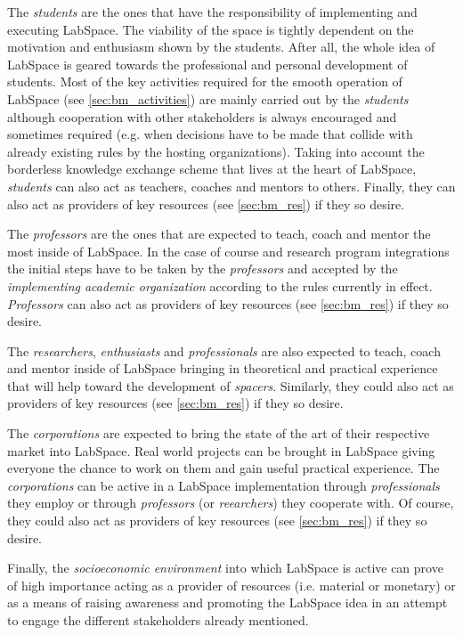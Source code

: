 \documentclass[a4paper, 11pt]{article}
\begin{document}
The \textit{students} are the ones that have the responsibility of implementing and executing LabSpace. The viability of the space is tightly dependent on the motivation and enthusiasm shown by the students. After all, the whole idea of LabSpace is geared towards the professional and personal development of students. Most of the key activities required for the smooth operation of LabSpace (see \ref{sec:bm_activities}) are mainly carried out by the \textit{students} although cooperation with other stakeholders is always encouraged and sometimes required (e.g. when decisions have to be made that collide with already existing rules by the hosting organizations). Taking into account the borderless knowledge exchange scheme that lives at the heart of LabSpace, \textit{students} can also act as teachers, coaches and mentors to others. Finally, they can also act as providers of key resources (see \ref{sec:bm_res}) if they so desire.

The \textit{professors} are the ones that are expected to teach, coach and mentor the most inside of LabSpace. In the case of course and research program integrations the initial steps have to be taken by the \textit{professors} and accepted by the \textit{implementing academic organization} according to the rules currently in effect. \textit{Professors} can also act as providers of key resources (see \ref{sec:bm_res}) if they so desire.

The \textit{researchers}, \textit{enthusiasts} and \textit{professionals} are also expected to teach, coach and mentor inside of LabSpace bringing in theoretical and practical experience that will help toward the development of \textit{spacers}. Similarly, they could also act as providers of key resources (see \ref{sec:bm_res}) if they so desire.

The \textit{corporations} are expected to bring the state of the art of their respective market into LabSpace. Real world projects can be brought in LabSpace giving everyone the chance to work on them and gain useful practical experience. The \textit{corporations} can be active in a LabSpace implementation through \textit{professionals} they employ or through \textit{professors} (or \textit{reearchers}) they cooperate with. Of course, they could also act as providers of key resources (see \ref{sec:bm_res}) if they so desire.

Finally, the \textit{socioeconomic environment} into which LabSpace is active can prove of high importance acting as a provider of resources (i.e. material or monetary) or as a means of raising awareness and promoting the LabSpace idea in an attempt to engage the different stakeholders already mentioned.
\end{document}
